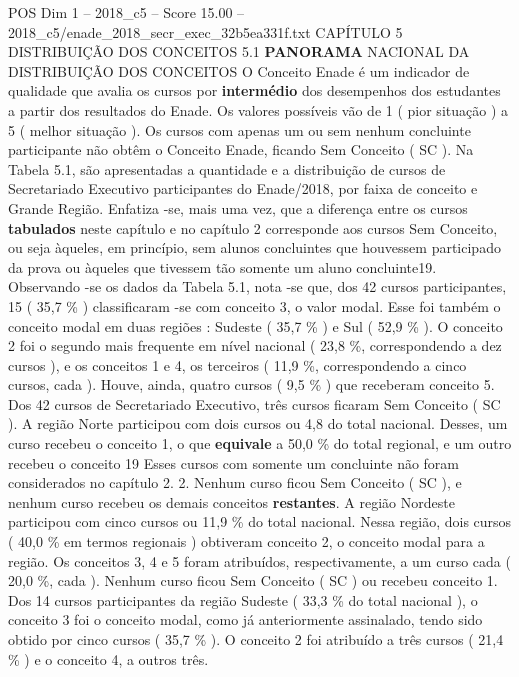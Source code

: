 \begin{textsample}{POS Dim 1 – 2018\_c5 – Score 15.00 – 2018\_c5/enade\_2018\_secr\_exec\_32b5ea331f.txt}  \label{ex:f1_pos_066}
CAPÍTULO 5 DISTRIBUIÇÃO DOS CONCEITOS 5.1 \textbf{PANORAMA} NACIONAL DA DISTRIBUIÇÃO DOS CONCEITOS O Conceito Enade é um indicador de qualidade que avalia os cursos por \textbf{intermédio} dos desempenhos dos estudantes a partir dos resultados do Enade.
Os valores possíveis vão de 1 ( pior situação ) a 5 ( melhor situação ).
Os cursos com apenas um ou sem nenhum concluinte participante não obtêm o Conceito Enade, ficando Sem Conceito ( SC ).
Na Tabela 5.1, são apresentadas a quantidade e a distribuição de cursos de Secretariado Executivo participantes do Enade/2018, por faixa de conceito e Grande Região.
Enfatiza -se, mais uma vez, que a diferença entre os cursos \textbf{tabulados} neste capítulo e no capítulo 2 corresponde aos cursos Sem Conceito, ou seja àqueles, em princípio, sem alunos concluintes que houvessem participado da prova ou àqueles que tivessem tão somente um aluno concluinte19.
Observando -se os dados da Tabela 5.1, nota -se que, dos 42 cursos participantes, 15 ( 35,7 \% ) classificaram -se com conceito 3, o valor modal.
Esse foi também o conceito modal em duas regiões : Sudeste ( 35,7 \% ) e Sul ( 52,9 \% ).
O conceito 2 foi o segundo mais frequente em nível nacional ( 23,8 \%, correspondendo a dez cursos ), e os conceitos 1 e 4, os terceiros ( 11,9 \%, correspondendo a cinco cursos, cada ).
Houve, ainda, quatro cursos ( 9,5 \% ) que receberam conceito 5.
Dos 42 cursos de Secretariado Executivo, três cursos ficaram Sem Conceito ( SC ).
A região Norte participou com dois cursos ou 4,8 do total nacional.
Desses, um curso recebeu o conceito 1, o que \textbf{equivale} a 50,0 \% do total regional, e um outro recebeu o conceito 19 Esses cursos com somente um concluinte não foram considerados no capítulo 2. 2.
Nenhum curso ficou Sem Conceito ( SC ), e nenhum curso recebeu os demais conceitos \textbf{restantes}.
A região Nordeste participou com cinco cursos ou 11,9 \% do total nacional.
Nessa região, dois cursos ( 40,0 \% em termos regionais ) obtiveram conceito 2, o conceito modal para a região.
Os conceitos 3, 4 e 5 foram atribuídos, respectivamente, a um curso cada ( 20,0 \%, cada ).
Nenhum curso ficou Sem Conceito ( SC ) ou recebeu conceito 1.
Dos 14 cursos participantes da região Sudeste ( 33,3 \% do total nacional ), o conceito 3 foi o conceito modal, como já anteriormente assinalado, tendo sido obtido por cinco cursos ( 35,7 \% ).
O conceito 2 foi atribuído a três cursos ( 21,4 \% ) e o conceito 4, a outros três.

\end{textsample}
